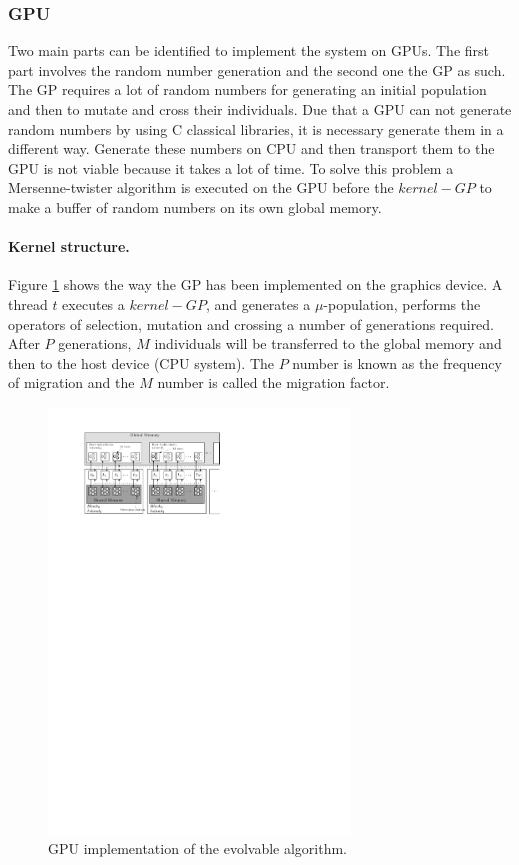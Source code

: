 \documentclass[runningheads,a4paper]{llncs}
\begin{document}
\subsubsection{GPU}
Two main parts can be identified to implement the system on GPUs. The first part involves the random number generation and the second one the GP as such. The GP requires a lot of random numbers for generating an initial population and then to mutate and cross their individuals. Due that a GPU can not generate random numbers by using C classical libraries, it is necessary generate them in a different way. Generate these numbers on CPU and then transport them to the GPU is not viable because it takes a lot of time. To solve this problem a Mersenne-twister algorithm is executed on the GPU before the $kernel-GP$ to make a buffer of random numbers on its own global memory.


\paragraph{Kernel structure.}
Figure \ref{fig:migration_scheme} shows the way the GP has been implemented on the graphics device. A thread $t$ executes a $kernel-GP$, and generates a $\mu$-population, performs the operators of selection, mutation and crossing a number of generations required. After $P$ generations, $M$ individuals will be transferred to the global memory and then to the host device (CPU system). The $P$ number is known as the frequency of migration and the $M$ number is called the migration factor.

\begin{figure}[htpb]
\begin{center} 
\includegraphics[width=8cm]{./images/migration_scheme} \end{center}
\caption{GPU implementation of the evolvable algorithm.}\label{fig:migration_scheme}
\end{figure}
\end{document}
